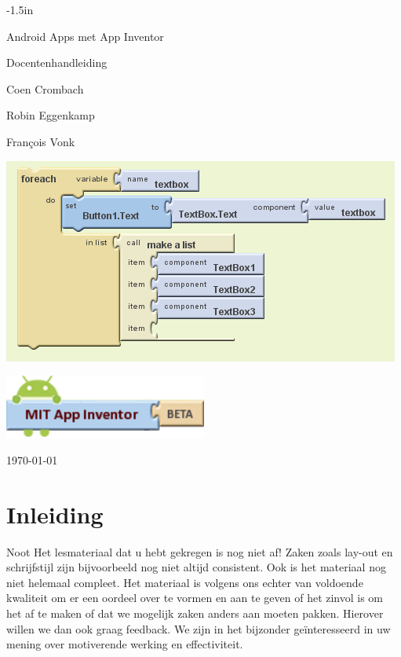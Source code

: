 \documentclass{BYUTextbook}
\begin{document}
\frontmatter

\thispagestyle{empty}
\begin{adjustwidth}{}{-1.5in}

 \centering
 \vspace{.6in}
 \Huge Android Apps met App Inventor
 
 \Huge Docentenhandleiding
 \normalsize
 \vspace{.6in}

Coen Crombach

Robin Eggenkamp

Fran\c{c}ois Vonk

 \vspace{0.4in}

\includegraphics[width=\textwidth]{screenshots/building_blocks}

\vspace{0.25in}

\includegraphics[width=0.5\textwidth]{screenshots/AppInventorLogo}

 \vspace{.6in}

\today


\end{adjustwidth}

\cleardoublepage

\tableofcontents

\mainmatter

\chapter{Inleiding}
\begin{derivation}{Noot}
  Het lesmateriaal dat u hebt gekregen is nog niet af! Zaken zoals lay-out en schrijfstijl zijn bijvoorbeeld nog niet altijd consistent. Ook is het materiaal nog niet helemaal compleet. Het materiaal is volgens ons echter van voldoende kwaliteit om er een oordeel over te vormen en aan te geven of het zinvol is om het af te maken of dat we mogelijk zaken anders aan moeten pakken. Hierover willen we dan ook graag feedback. We zijn in het bijzonder ge\"interesseerd in uw mening over motiverende werking en effectiviteit.
\end{derivation}
\end{document}
